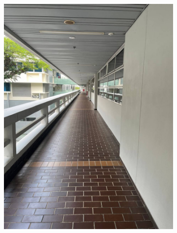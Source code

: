 \documentclass[12pt]{report}
\begin{document}
\begin{figure}[h]
\begin{subfigure}[b]{0.19\textwidth}
        \includegraphics[width=\textwidth]{walking-area-4}
    \end{subfigure}
    \begin{subfigure}[b]{0.19\textwidth}
        \centering

\end{subfigure}
\end{figure}
\end{document}
